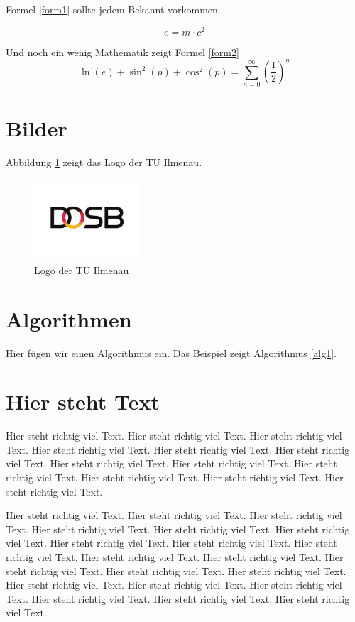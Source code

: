 Formel \ref{form1} sollte jedem Bekannt vorkommen.

\begin{equation}
e = m \cdot c^2
\label{form1}
\end{equation}

Und noch ein wenig Mathematik zeigt Formel \ref{form2}
\begin{equation}
\ln(e) + \sin^2(p) + \cos^2 (p) = \sum_{n=0}^{\infty} \left(\frac{1}{2}\right)^n
\label{form2}
\end{equation}


\section{Bilder}

Abbildung \ref{pic:logo} zeigt das Logo der TU Ilmenau.

\begin{figure}[t]
\begin{center}
	\includegraphics[height=3cm]{pics/DOSB.png}
\end{center}
\caption{Logo der TU Ilmenau}
\label{pic:logo}
\end{figure}


\section{Algorithmen}

Hier fügen wir einen Algorithmus ein. Das Beispiel zeigt Algorithmus \ref{alg1}.


\section{Hier steht Text}

Hier steht richtig viel Text.
Hier steht richtig viel Text.
Hier steht richtig viel Text.
Hier steht richtig viel Text.
Hier steht richtig viel Text.
Hier steht richtig viel Text.
Hier steht richtig viel Text.
Hier steht richtig viel Text.
Hier steht richtig viel Text.
Hier steht richtig viel Text.
Hier steht richtig viel Text.
Hier steht richtig viel Text.

Hier steht richtig viel Text.
Hier steht richtig viel Text.
Hier steht richtig viel Text.
Hier steht richtig viel Text.
Hier steht richtig viel Text.
Hier steht richtig viel Text.
Hier steht richtig viel Text.
Hier steht richtig viel Text.
Hier steht richtig viel Text.
Hier steht richtig viel Text.
Hier steht richtig viel Text.
Hier steht richtig viel Text.
Hier steht richtig viel Text.
Hier steht richtig viel Text.
Hier steht richtig viel Text.
Hier steht richtig viel Text.
Hier steht richtig viel Text.
Hier steht richtig viel Text.
Hier steht richtig viel Text.
Hier steht richtig viel Text.

